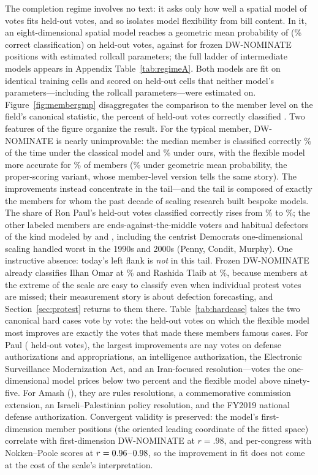 \documentclass[12pt]{article}
\begin{document}
The completion regime involves no text: it asks only how well a
spatial model of votes fits held-out votes, and so isolates model
flexibility from bill content. In it, an eight-dimensional spatial
model reaches a geometric mean probability of \regimeAbestGMP{}
(\regimeAbestAcc\% correct classification) on held-out votes, against
\regimeAnominateGMP{} for frozen DW-NOMINATE positions with estimated
rollcall parameters; the full ladder of intermediate models appears
in Appendix Table~\ref{tab:regimeA}. Both models are fit on identical
training cells and scored on held-out cells that neither model's
parameters---including the rollcall parameters---were estimated on.
Figure~\ref{fig:membergmp} disaggregates the comparison to the member
level on the field's canonical statistic, the percent of held-out
votes correctly classified \citep{poole1997congress}. Two features of
the figure organize the result. For the typical member, DW-NOMINATE
is nearly unimprovable: the median member is classified correctly
\memberCCmedNom\% of the time under the classical model and
\memberCCmedOurs\% under ours, with the flexible model more accurate
for \memberCCshare\% of members (\memberGMPshare\% under geometric
mean probability, the proper-scoring variant, whose member-level
version tells the same story). The improvements instead concentrate
in the tail---and the tail is composed of exactly the members for
whom the past decade of scaling research built bespoke models. The
share of Ron Paul's held-out votes classified correctly rises from
\paulCCnom\% to \paulCCours\%; the other labeled members are
ends-against-the-middle voters and habitual defectors of the kind
modeled by \citet{duckmayr2023ends} and \citet{fowler2026protest},
including the centrist Democrats one-dimensional scaling handled
worst in the 1990s and 2000s (Penny, Condit, Murphy). One instructive
absence: today's left flank is \emph{not} in this tail. Frozen
DW-NOMINATE already classifies Ilhan Omar at \omarCCnom\% and Rashida
Tlaib at \tlaibCCnom\%, because members at the extreme of the scale
are easy to classify even when individual protest votes are missed;
their measurement story is about defection forecasting, and
Section~\ref{sec:protest} returns to them there.
Table~\ref{tab:hardcase} takes the two canonical hard cases vote by
vote: the held-out votes on which the flexible model most improves
are exactly the votes that made these members famous cases. For Paul
(\paulHeldoutN{} held-out votes), the largest improvements are nay
votes on defense authorizations and appropriations, an intelligence
authorization, the Electronic Surveillance Modernization Act, and an
Iran-focused resolution---votes the one-dimensional model prices
below two percent and the flexible model above ninety-five. For
Amash (\amashHeldoutN{}), they are rules resolutions, a commemorative
commission extension, an Israeli--Palestinian policy resolution, and
the FY2019 national defense authorization. Convergent validity is
preserved:
the model's first-dimension member positions (the oriented leading
coordinate of the fitted space) correlate with first-dimension
DW-NOMINATE at $r = .98$, and per-congress with Nokken--Poole scores
\citep{nokken2004congressional} at $r = 0.96$--$0.98$, so the
improvement in fit does not come at the cost of the scale's
interpretation.
\end{document}
